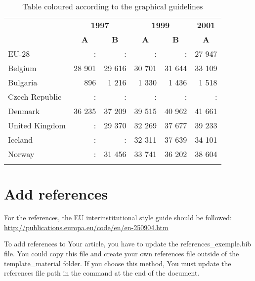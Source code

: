 \documentclass[Theme1]{{template_material/eurostat}}
\begin{document}
\begin{table}[h]
\caption{Table coloured according to the graphical guidelines\label{tab8}}
\begin{tabular}{l|r r|r r|r}
\hlinesep
\rowcolor{TH20p}
\multirow{2}{*}{} & \multicolumn{2}{c|}{\bf 1997} & \multicolumn{2}{c|}{\bf 1999} & \multicolumn{1}{c}{\bf 2001}   \\ \cline{2-6}
\rowcolor{TH20p}
                  & \multicolumn{1}{c}{\bf A}   & \multicolumn{1}{c|}{\bf B} & \multicolumn{1}{c}{\bf A} & \multicolumn{1}{c|}{\bf B} & \multicolumn{1}{c}{\bf A}      \\ \hlinesep
\rowcolor{TH30p}
EU-28             & :           & :           & :           & :           & 27 947 \\ \hlinesep
Belgium           & 28 901      & 29 616      & 30 701      & 31 644      & 33 109 \\ \hline
Bulgaria          & 896         & 1 216       & 1 330       & 1 436       & 1 518  \\ \hline
Czech Republic    & :           & :           & :           & :           & :      \\ \hline
Denmark           & 36 235      & 37 209      & 39 515      & 40 962      & 41 661 \\ \hline
United Kingdom    & :           & 29 370      & 32 269      & 37 677      & 39 233 \\ \hlinesep
Iceland           & :           & :           & 32 311      & 37 639      & 34 101 \\ \hline
Norway            & :           & 31 456      & 33 741      & 36 202      & 38 604 \\ \hlinesep
\end{tabular}
\end{table}

\newpage
\section{Add references}

For the references, the EU interinstitutional style guide should be followed: \url{http://publications.europa.eu/code/en/en-250904.htm}

To add references to Your article, you have to update the references\_exemple.bib file. You could copy this file and create your own references file outside of the template\_material folder. If you choose this method, You must update the references file path in the  command at the end of the document. 
\end{document}
